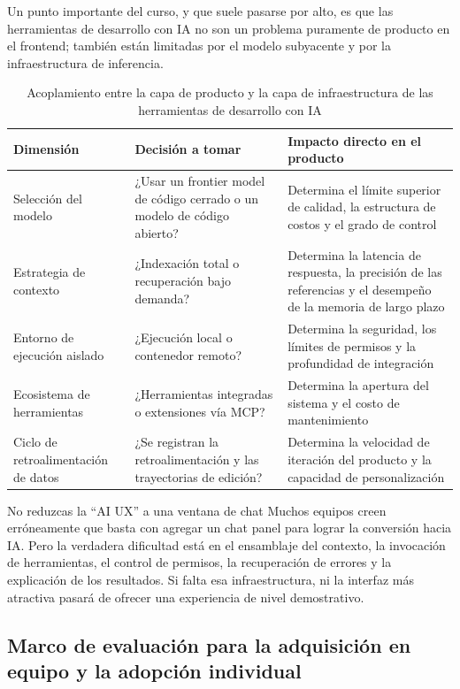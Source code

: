 \documentclass[a4paper]{article}
\begin{document}
Un punto importante del curso, y que suele pasarse por alto, es que las herramientas de desarrollo con IA no son un problema puramente de producto en el frontend; también están limitadas por el modelo subyacente y por la infraestructura de inferencia.

\begin{table}[H]
\centering
\begin{tabular}{p{} p{} p{}}
\toprule
Dimensión & Decisión a tomar & Impacto directo en el producto \\
\midrule
Selección del modelo & ¿Usar un frontier model de código cerrado o un modelo de código abierto? & Determina el límite superior de calidad, la estructura de costos y el grado de control \\
Estrategia de contexto & ¿Indexación total o recuperación bajo demanda? & Determina la latencia de respuesta, la precisión de las referencias y el desempeño de la memoria de largo plazo \\
Entorno de ejecución aislado & ¿Ejecución local o contenedor remoto? & Determina la seguridad, los límites de permisos y la profundidad de integración \\
Ecosistema de herramientas & ¿Herramientas integradas o extensiones vía MCP? & Determina la apertura del sistema y el costo de mantenimiento \\
Ciclo de retroalimentación de datos & ¿Se registran la retroalimentación y las trayectorias de edición? & Determina la velocidad de iteración del producto y la capacidad de personalización \\
\bottomrule
\end{tabular}
\caption{Acoplamiento entre la capa de producto y la capa de infraestructura de las herramientas de desarrollo con IA}
\end{table}

\begin{warningbox}{No reduzcas la ``AI UX'' a una ventana de chat}
Muchos equipos creen erróneamente que basta con agregar un chat panel para lograr la conversión hacia IA. Pero la verdadera dificultad está en el ensamblaje del contexto, la invocación de herramientas, el control de permisos, la recuperación de errores y la explicación de los resultados. Si falta esa infraestructura, ni la interfaz más atractiva pasará de ofrecer una experiencia de nivel demostrativo.
\end{warningbox}

\subsection{Marco de evaluación para la adquisición en equipo y la adopción individual}
\end{document}
